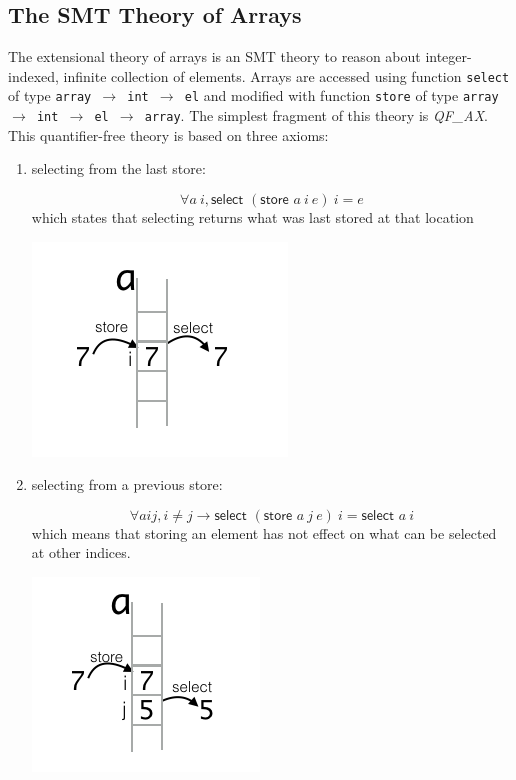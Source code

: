 \documentclass[onecolumn, preprint]{sigplanconf}
\begin{document}
\subsection{The SMT Theory of Arrays}
The extensional theory of arrays is an SMT theory to reason about integer-indexed, infinite collection of elements. Arrays are accessed using function \texttt{select} of type \texttt{array $\rightarrow$ int $\rightarrow$ el} and modified with function \texttt{store} of type \texttt{array $\rightarrow$ int $\rightarrow$ el $\rightarrow$ array}. The simplest fragment of this theory is \emph{QF\_AX}. This quantifier-free theory is based on three axioms:
\begin{enumerate}
\item selecting from the last store:
  \begin{multicols}{2}
    
  $$ \forall a\ i, \textsf{select } (\textsf{store } a\ i\ e)\ i = e$$
which states that selecting returns what was last stored at that location
 
\includegraphics[scale=0.5]{pictures/axiom1.png}

  \end{multicols}
  
\item selecting from a previous store:
  \begin{multicols}{2}
  $$ \forall a i j, i \neq j \to \textsf{select } (\textsf{store } a\ j\ e)\ i = \textsf{select } a\ i$$
  which means that storing an element has not effect on what can be selected at other indices.

  \includegraphics[scale=0.5]{pictures/axiom2.png}
  \end{multicols}
  

\end{enumerate}
\end{document}
